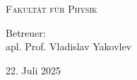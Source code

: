 \begin{titlepage}
    \vfill
    \vspace{0.5cm}
    \textsc{Fakultät für Physik}
    
    \vspace{0.6cm}
    \vspace{0.3cm}


    Betreuer: \\apl. Prof. Vladislav Yakovlev %

    \vfill
    \vspace{0.9cm}
    
    {\Large 22. Juli 2025}
    
\end{titlepage}
